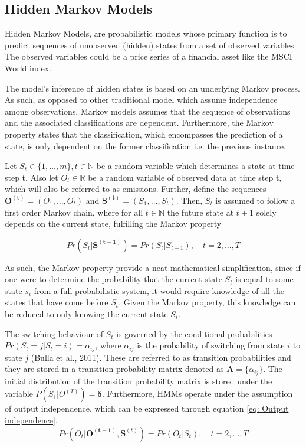 \subsection{Hidden Markov Models}
\label{subsection: HMM}
Hidden Markov Models, are probabilistic models whose primary function is to predict sequences of unobserved (hidden) states from a set of observed variables. The observed variables could be a price series of a financial asset like the MSCI World index.

The model’s inference of hidden states is based on an underlying Markov process. As such, as opposed to other traditional model which assume independence among observations, Markov models assumes that the sequence of observations and the associated classifications are dependent. Furthermore, the Markov property states that the classification, which encompasses the prediction of a state, is only dependent on the former classification i.e. the previous instance. 

Let $S_t \in \{1,\ldots, m\}, t \in \mathbb{N}$ be a random variable which determines a state at time step t. Also let $O_t \in \mathbb{R}$ be a random variable of observed data at time step t, which will also be referred to as emissions. Further, define the sequences $\mathbf{O^{(t)}}=(O_1,\ldots,O_t)$ and $\mathbf{S^{(t)}}=(S_1,\ldots,S_t)$. Then, $S_t$ is assumed to follow a first order Markov chain, where for all $t \in \mathbb{N}$ the future state at $t + 1$ solely depends on the current state, fulfilling the Markov property

\begin{equation}
    Pr(S_t | \mathbf{S^{(t-1)}}) = Pr(S_t | S_{t-1}),
    \quad t=2,\ldots,T
    \label{eq:model_markov_property}
\end{equation} 

As such, the Markov property provide a neat mathematical simplification, since if one were to determine the probability that the current state $S_t$ is equal to some state $s_i$ from a full probabilistic system, it would require knowledge of all the states that have come before $S_t$. Given the Markov property, this knowledge can be reduced to only knowing the current state $S_t$. 

The switching behaviour of $S_t$ is governed by the conditional probabilities $Pr(S_{t} = j| S_t = i) = \alpha_{ij}$, where $\alpha_{ij}$ is the probability of switching from state $i$ to state $j$ (Bulla et al., 2011). These are referred to as transition probabilities and they are stored in a transition probability matrix denoted as $\mathbf{A} = \{{\alpha_{ij}}\}$. The initial distribution of the transition probability matrix is stored under the variable $P(S_1|O^{(T)})=\boldsymbol{\delta}$. Furthermore, HMMs operate under the assumption of output independence, which can be expressed through equation \ref{eq: Output independence}.
\begin{equation}
    Pr(O_t|\mathbf{O^{(t-1)}}, \mathbf{S}^{(t)}) = Pr(O_t|S_t),
    \quad t=2,\ldots,T
    \label{eq: Output independence}
\end{equation}

